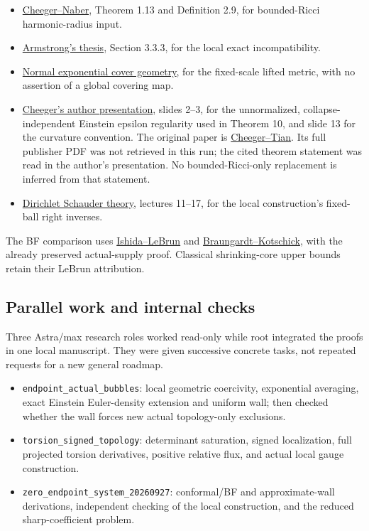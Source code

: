 \documentclass[
  10pt,
]{article}
\providecommand{\tightlist}{%
  \setlength{\itemsep}{0pt}\setlength{\parskip}{0pt}}
\begin{document}
\begin{itemize}
\tightlist
\item
  \href{https://arxiv.org/pdf/1406.6534}{Cheeger--Naber}, Theorem 1.13
  and Definition 2.9, for bounded-Ricci harmonic-radius input.
\item
  \href{https://johnarmstrongmaths.com/publications/resources/thesis.pdf}{Armstrong's
  thesis}, Section 3.3.3, for the local exact incompatibility.
\item
  \href{https://arxiv.org/html/2601.16176v1\#S2.SS3}{Normal exponential
  cover geometry}, for the fixed-scale lifted metric, with no assertion
  of a global covering map.
\item
  \href{https://sites.duke.edu/scshgap/files/2016/08/dim4dukebeamer.pdf}{Cheeger's
  author presentation}, slides 2--3, for the unnormalized,
  collapse-independent Einstein epsilon regularity used in Theorem 10,
  and slide 13 for the curvature convention. The original paper is
  \href{https://doi.org/10.1090/S0894-0347-05-00511-4}{Cheeger--Tian}.
  Its full publisher PDF was not retrieved in this run; the cited
  theorem statement was read in the author's presentation. No
  bounded-Ricci-only replacement is inferred from that statement.
\item
  \href{https://ocw.mit.edu/courses/18-156-differential-analysis-spring-2004/pages/lecture-notes/}{Dirichlet
  Schauder theory}, lectures 11--17, for the local construction's
  fixed-ball right inverses.
\end{itemize}

The BF comparison uses
\href{https://arxiv.org/html/math/0111228}{Ishida--LeBrun} and
\href{https://arxiv.org/pdf/math/0306021}{Braungardt--Kotschick}, with
the already preserved actual-supply proof. Classical shrinking-core
upper bounds retain their LeBrun attribution.

\hypertarget{parallel-work-and-internal-checks}{%
\subsection{Parallel work and internal
checks}\label{parallel-work-and-internal-checks}}

Three Astra/max research roles worked read-only while root integrated
the proofs in one local manuscript. They were given successive concrete
tasks, not repeated requests for a new general roadmap.

\begin{itemize}
\tightlist
\item
  \texttt{endpoint\_actual\_bubbles}: local geometric coercivity,
  exponential averaging, exact Einstein Euler-density extension and
  uniform wall; then checked whether the wall forces new actual
  topology-only exclusions.
\item
  \texttt{torsion\_signed\_topology}: determinant saturation, signed
  localization, full projected torsion derivatives, positive relative
  flux, and actual local gauge construction.
\item
  \texttt{zero\_endpoint\_system\_20260927}: conformal/BF and
  approximate-wall derivations, independent checking of the local
  construction, and the reduced sharp-coefficient problem.
\end{itemize}
\end{document}

